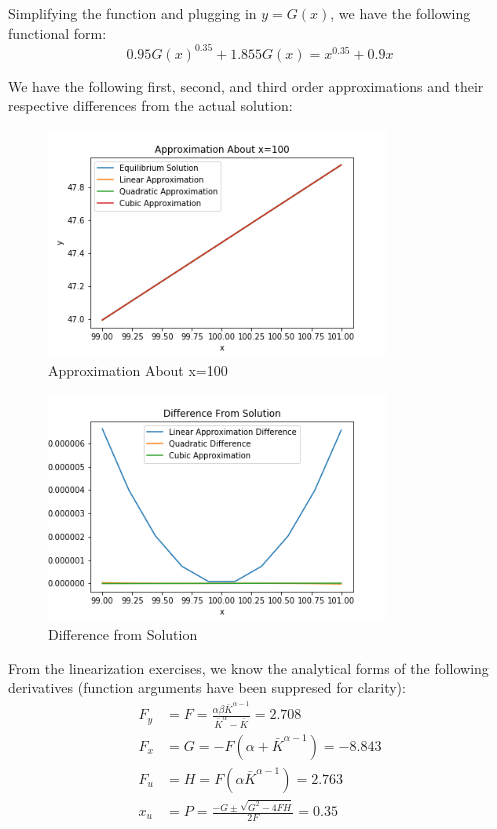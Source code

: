 \documentclass[letterpaper,11pt]{article}
\theoremstyle{definition}
\begin{document}
\begin{spacing}{1.5}
	\begin{Exercise} \label{Perturb_HW_Bivar_Grid}
		Simplifying the function and plugging in $y=G(x)$, we have the following functional form:
		\begin{equation*}
			0.95G(x)^{0.35}+1.855G(x) = x^{0.35}+0.9x
		\end{equation*}

		We have the following first, second, and third order approximations and their respective differences from the actual solution:

		\begin{figure}[H]
			\caption{Approximation About x=100}
			\label{fig:approx_F}
			\includegraphics[width=0.8\textwidth]{approx_F.png}
		\end{figure}

		\begin{figure}[H]
			\caption{Difference from Solution}
			\label{fig:approx_diff}
			\includegraphics[width=0.8\textwidth]{approx_diff.png}
		\end{figure}
	\end{Exercise}

	\begin{Exercise} \label{Perturb_HW_BM_NoStoch}
		From the linearization exercises, we know the analytical forms of the following derivatives (function arguments have been suppresed for clarity):
		\begin{align*}
			F_y &= F = \frac{\alpha\beta\bar{K}^{\alpha-1}}{\bar{K}^\alpha-\bar{K}} = 2.708 \\
			F_x &= G = -F(\alpha+\bar{K}^{\alpha-1}) = -8.843 \\
			F_u &= H = F(\alpha\bar{K}^{\alpha-1}) = 2.763 \\
			x_u &= P = \frac{-G \pm \sqrt{G^2-4FH}}{2F} = 0.35
		\end{align*}


\end{Exercise}
\end{spacing}
\end{document}
